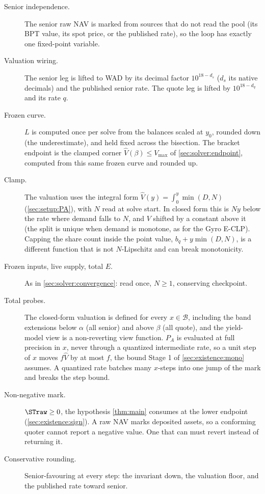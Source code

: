 \begin{description}
  \item[Senior independence.] The senior raw NAV is marked from sources
    that do not read the pool (its BPT value, its spot price, or the
    published rate), so the loop has exactly one fixed-point variable.
  \item[Valuation wiring.] The senior leg is lifted to WAD by its
    decimal factor $10^{18 - d_s}$ ($d_s$ its native decimals) and the
    published senior rate. The quote leg is lifted by $10^{18 - d_q}$
    and its rate $q$.
  \item[Frozen curve.] $L$ is computed once per solve from the balances
    scaled at $y_0$, rounded down (the underestimate), and held fixed across the
    bisection. The bracket endpoint is the clamped corner
    $\widehat{V}(\beta) \leq V_{\max}$ of \cref{sec:solver:endpoint},
    computed from this same frozen curve and rounded up.
  \item[Clamp.] The valuation uses the integral form
    $\widehat{V}(y) = \int_0^y \min(D, N)$ (\cref{sec:setup:PA}), with $N$
    read at solve start. In closed form this is $N y$ below the rate
    where demand falls to $N$, and $V$ shifted by a constant above it
    (the split is unique when demand is monotone, as for the Gyro
    E-CLP). Capping the share count inside the point value,
    $b_q + y\min(D,N)$, is a different function that is not $N$-Lipschitz
    and can break monotonicity.
  \item[Frozen inputs, live supply, total $E$.] As in
    \cref{sec:solver:convergence}: read once, $N \geq 1$, conserving
    checkpoint.
  \item[Total probes.] The closed-form valuation is defined for every
    $x \in \mathcal{B}$, including the band extensions below $\alpha$
    (all senior) and above $\beta$ (all quote), and the yield-model view
    is a non-reverting view function. $P_A$ is evaluated at full
    precision in $x$, never through a quantized intermediate rate, so a
    unit step of $x$ moves $f\widehat{V}$ by at most $f$, the bound
    Stage 1 of \cref{sec:existence:mono} assumes. A quantized rate
    batches many $x$-steps into one jump of the mark and breaks the
    step bound.
  \item[Non-negative mark.] $\STraw \geq 0$, the hypothesis
    \cref{thm:main} consumes at the lower endpoint
    (\cref{sec:existence:sign}). A raw NAV marks deposited assets, so a
    conforming quoter cannot report a negative value. One that can must
    revert instead of returning it.
  \item[Conservative rounding.] Senior-favouring at every step: the
    invariant down, the valuation floor, and the published rate toward
    senior.
\end{description}

